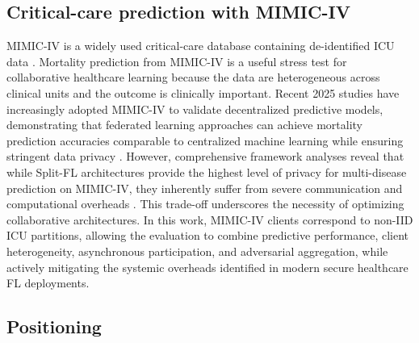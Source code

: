\documentclass[pdflatex,sn-mathphys-num]{sn-jnl}
\begin{document}
\subsection{Critical-care prediction with MIMIC-IV}
MIMIC-IV is a widely used critical-care database containing de-identified ICU data \cite{johnson2023mimic}. Mortality prediction from MIMIC-IV is a useful stress test for collaborative healthcare learning because the data are heterogeneous across clinical units and the outcome is clinically important. Recent 2025 studies have increasingly adopted MIMIC-IV to validate decentralized predictive models, demonstrating that federated learning approaches can achieve mortality prediction accuracies comparable to centralized machine learning while ensuring stringent data privacy \cite{healthinf25}. However, comprehensive framework analyses reveal that while Split-FL architectures provide the highest level of privacy for multi-disease prediction on MIMIC-IV, they inherently suffer from severe communication and computational overheads \cite{cryptenfl2025}. This trade-off underscores the necessity of optimizing collaborative architectures. In this work, MIMIC-IV clients correspond to non-IID ICU partitions, allowing the evaluation to combine predictive performance, client heterogeneity, asynchronous participation, and adversarial aggregation, while actively mitigating the systemic overheads identified in modern secure healthcare FL deployments.

\subsection{Positioning}
\end{document}
